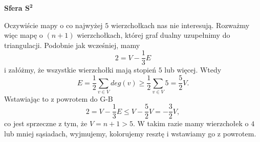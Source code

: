 \begin{enumerate}[label=\texbtf{(\alph*)}]
    \textbf{Sfera $\mathbf{S^2}$} \dotfill

    Oczywiście mapy o co najwyżej $5$ wierzchołkach nas nie interesują. Rozważmy więc mapę o $(n+1)$ wierzchołkach, której graf dualny uzupełnimy do triangulacji. Podobnie jak wcześniej, mamy
    $$2=V-\frac{1}{3}E$$
    i załóżmy, że wszystkie wierzchołki mają stopień $5$ lub więcej. Wtedy
    $$E=\frac{1}{2}\sum_{v\in V}deg(v)\geq \frac{1}{2}\sum_{v\in V}5=\frac{5}{2}V.$$
    Wstawiając to z powrotem do G-B
    $$2=V-\frac{1}{3}E\leq V-\frac{5}{2}V=-\frac{3}{2}V,$$
    co jest sprzeczne z tym, że $V=n+1>5$. W takim razie mamy wierzchołek o $4$ lub mniej sąsiadach, wyjmujemy, kolorujemy resztę i wstawiamy go z powrotem.


\end{enumerate}
